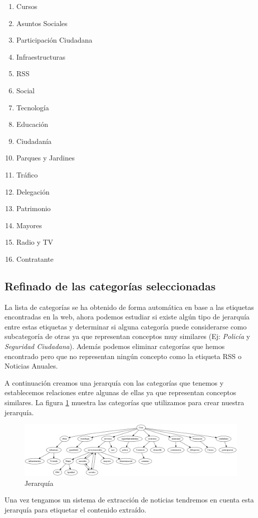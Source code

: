 \begin{multicols}{3}
\begin{enumerate}
    \item Cursos
    \item Asuntos Sociales
    \item Participación Ciudadana
    \item Infraestructuras
    \item RSS
    \item Social
    \item Tecnología
    \item Educación
    \item Ciudadanía
    \item Parques y Jardines
    \item Tráfico
    \item Delegación
    \item Patrimonio
    \item Mayores
    \item Radio y TV
    \item Contratante
\end{enumerate}
\end{multicols}

\subsection{Refinado de las categorías seleccionadas}

La lista de categorías se ha obtenido de forma automática en base a las etiquetas encontradas en la web, ahora podemos estudiar si existe algún tipo de jerarquía entre estas etiquetas y determinar si alguna categoría puede considerarse como subcategoría de otras ya que representan conceptos muy similares (Ej: \textit{Policía} y \textit{Seguridad Ciudadana}). Además podemos eliminar categorías que hemos encontrado pero que no representan ningún concepto como la etiqueta RSS o Noticias Anuales.

A continuación creamos una jerarquía con las categorías que tenemos y establecemos relaciones entre algunas de ellas ya que representan conceptos similares. La figura \ref{fig:ontologia} muestra las categorías que utilizamos para crear nuestra jerarquía.

\begin{figure}
\includegraphics[width=\textwidth]{Categorias/creacion_conjunto/semandal.png}
\caption{Jerarquía}
\label{fig:ontologia}
\end{figure}

Una vez tengamos un sistema de extracción de noticias tendremos en cuenta esta jerarquía para etiquetar el contenido extraído.
